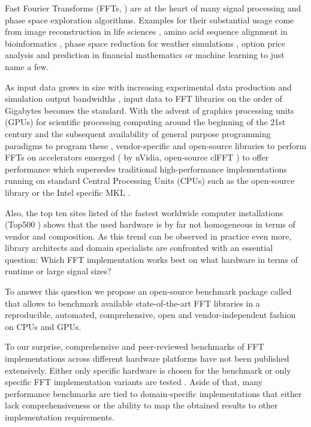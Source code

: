 Fast Fourier Transforms (FFTs, \citep{van1992computational}) are at the heart of many signal processing and phase space exploration algorithms. Examples for their substantial usage come from image reconstruction in life sciences \citep{preibisch2014efficient,schmid2015real}, amino acid sequence alignment in bioinformatics \citep{katoh2002mafft}, phase space reduction for weather simulations \citep{maronga2015parallelized}, option price analysis and prediction in financial mathematics \citep{hurd2010fourier} or machine learning \citep{dlstudy} to just name a few.

As input data grows in size with increasing experimental data production \citep{huisken2004optical} and simulation output bandwidths \citep{maronga2015parallelized}, input data to FFT libraries on the order of Gigabytes becomes the standard. With the advent of graphics processing units (GPUs) for scientific processing computing around the beginning of the 21st century and the subsequent availability of general purpose programming paradigms to program these \citep{du2012cuda}, vendor-specific and open-source libraries to perform FFTs on accelerators emerged (\cufft{} \citep{nvidia2010cufft} by nVidia, open-source clFFT \citep{clfft}) to offer performance which supersedes traditional high-performance implementations running on standard Central Processing Units (CPUs) such as the open-source \fftw{} library \citep{FFTW05} or the Intel specific MKL \citep{intel2007intel}.

Also, the top ten sites listed of the fastest worldwide computer installations (Top500 \citep{meuer2011top500}) shows that the used hardware is by far not homogeneous in terms of vendor and composition. As this trend can be observed in practice even more, library architects and domain specialists are confronted with an essential question: Which FFT implementation works best on what hardware in terms of runtime or large signal sizes?  

To answer this question we propose an open-source benchmark package called \gearshifft{} \citep{gearshifft_github} that allows to benchmark available state-of-the-art FFT libraries in a reproducible, automated, comprehensive, open and vendor-independent fashion on CPUs and GPUs.

To our surprise, comprehensive and peer-reviewed benchmarks of FFT implementations across different hardware platforms have not been published extensively. Either only specific hardware is chosen for the benchmark \citep{park2015fast,eleftheriou2005performance,Akin:15} or only specific FFT implementation variants are tested \citep{shoc2010,dongarra2013hpc}. Aside of that, many performance benchmarks are tied to domain-specific implementations \citep{fialka2006fft} that either lack comprehensiveness or the ability to map the obtained results to other implementation requirements.

